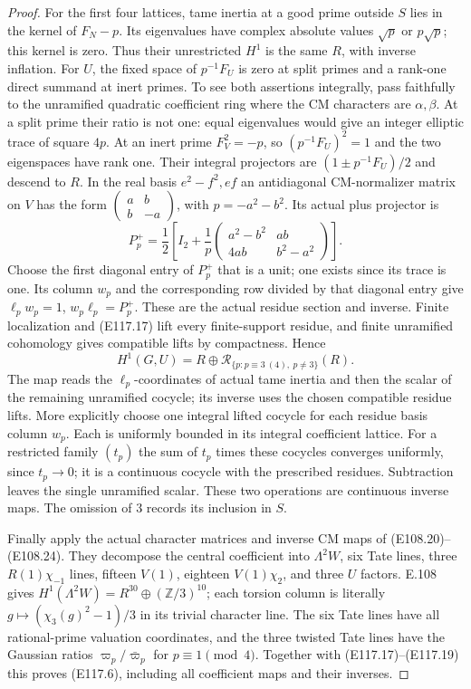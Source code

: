 \begin{proof}
For the first four lattices, tame inertia at a good prime
outside $S$ lies in the kernel of $F_N-p$.  Its eigenvalues
have complex absolute values $\sqrt p$ or $p\sqrt p$;
this kernel is zero.  Thus their unrestricted $H^1$ is
the same $R$, with inverse inflation.  For $U$, the fixed
space of $p^{-1}F_U$ is zero at split primes and a rank-one
direct summand at inert primes.  To see both assertions
integrally, pass faithfully to the unramified quadratic
coefficient ring where the CM characters are $\alpha,\beta$.
At a split prime their ratio is not one: equal eigenvalues
would give an integer elliptic trace of square $4p$.
At an inert prime $F_V^2=-p$, so $(p^{-1}F_U)^2=1$ and
the two eigenspaces have rank one.  Their integral
projectors are $(1\pm p^{-1}F_U)/2$ and descend to $R$.
In the real basis $e^2-f^2,ef$ an antidiagonal CM-normalizer
matrix on $V$ has the form
$\left(\begin{smallmatrix}a&b\\b&-a\end{smallmatrix}\right)$,
with $p=-a^2-b^2$.  Its actual plus projector is
\[
 P_p^+=\frac12\left[
 I_2+\frac1p
 \begin{pmatrix}a^2-b^2&ab\\4ab&b^2-a^2\end{pmatrix}
 \right].
 \tag{E117.18}
\]
Choose the first diagonal entry of $P_p^+$ that is a unit;
one exists since its trace is one.  Its column $w_p$ and
the corresponding row divided by that diagonal entry
give $\ell_pw_p=1$, $w_p\ell_p=P_p^+$.
These are the actual residue section and inverse.
Finite localization and (E117.17) lift every finite-support
residue, and finite unramified cohomology gives compatible
lifts by compactness.  Hence
\[
 H^1(G,U)=R\oplus
 \mathcal R_{\{p:p\equiv3\ (4),\ p\ne3\}}(R).
 \tag{E117.19}
\]
The map reads the $\ell_p$-coordinates of actual tame
inertia and then the scalar of the remaining unramified
cocycle; its inverse uses the chosen compatible residue
lifts.  More explicitly choose one integral lifted cocycle
for each residue basis column $w_p$.  Each is uniformly
bounded in its integral coefficient lattice.  For a restricted
family $(t_p)$ the sum of $t_p$ times these cocycles converges
uniformly, since $t_p\to0$; it is a continuous cocycle with
the prescribed residues.  Subtraction leaves the single
unramified scalar.  These two operations are continuous
inverse maps.  The omission of $3$ records its inclusion in $S$.

Finally apply the actual character matrices and inverse
CM maps of (E108.20)--(E108.24).  They decompose the central
coefficient into $\Lambda^2W$, six Tate lines, three
$R(1)\chi_{-1}$ lines, fifteen $V(1)$, eighteen
$V(1)\chi_2$, and three $U$ factors.
E.108 gives $H^1(\Lambda^2W)=R^{30}\oplus(\mathbb Z/3)^{10}$;
each torsion column is literally
$g\mapsto(\chi_3(g)^2-1)/3$ in its trivial character line.
The six Tate lines have all rational-prime valuation
coordinates, and the three twisted Tate lines have the
Gaussian ratios $\varpi_p/\bar\varpi_p$ for $p\equiv1\pmod4$.
Together with (E117.17)--(E117.19) this proves (E117.6),
including all coefficient maps and their inverses.


\end{proof}
